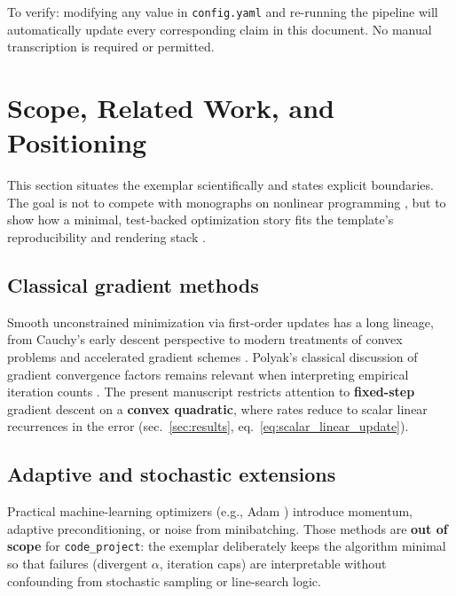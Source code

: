 \documentclass[
]{article}
\begin{document}
To verify: modifying any value in \texttt{config.yaml} and re-running
the pipeline will automatically update every corresponding claim in this
document. No manual transcription is required or permitted.

\newpage

\section{Scope, Related Work, and Positioning}\label{sec:scope}

This section situates the exemplar scientifically and states explicit
boundaries. The goal is not to compete with monographs on nonlinear
programming \citep{nocedal2006numerical, bertsekas1999nonlinear}, but to
show how a minimal, test-backed optimization story fits the template's
reproducibility and rendering stack \citep{peng2011reproducible}.

\subsection{Classical gradient
methods}\label{classical-gradient-methods}

Smooth unconstrained minimization via first-order updates has a long
lineage, from Cauchy's early descent perspective
\citep{cauchy1847methode} to modern treatments of convex problems
\citep{boyd2004convex} and accelerated gradient schemes
\citep{nesterov2013gradient}. Polyak's classical discussion of gradient
convergence factors remains relevant when interpreting empirical
iteration counts \citep{polyak1964some}. The present manuscript
restricts attention to \textbf{fixed-step} gradient descent on a
\textbf{convex quadratic}, where rates reduce to scalar linear
recurrences in the error (sec.~\ref{sec:results},
eq.~\ref{eq:scalar_linear_update}).

\subsection{Adaptive and stochastic
extensions}\label{adaptive-and-stochastic-extensions}

Practical machine-learning optimizers (e.g., Adam
\citep{kingma2014adam}) introduce momentum, adaptive preconditioning, or
noise from minibatching. Those methods are \textbf{out of scope} for
\texttt{code\_project}: the exemplar deliberately keeps the algorithm
minimal so that failures (divergent \(\alpha\), iteration caps) are
interpretable without confounding from stochastic sampling or
line-search logic.
\end{document}
